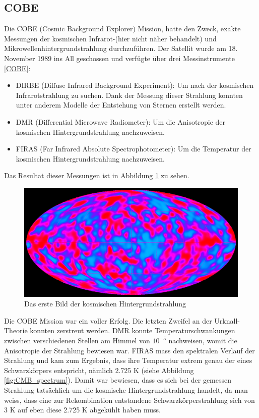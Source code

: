 \subsection{COBE}
Die COBE (Cosmic Background Explorer) Mission, hatte den Zweck, exakte 
Messungen der kosmischen Infrarot-(hier nicht näher behandelt) und 
Mikrowellenhintergrundstrahlung durchzuführen.
Der Satellit wurde am 18. November 1989 ins All geschossen und verfügte über 
drei Messinstrumente \ref{COBE}:
\begin{itemize}
	\item DIRBE (Diffuse Infrared Background Experiment): Um nach der 
	kosmischen Infrarotstrahlung zu suchen.
	Dank der Messung dieser Strahlung konnten unter anderem Modelle der 
	Entstehung von Sternen erstellt werden.
	\item DMR (Differential Microwave Radiometer): Um die Anisotropie der 
	kosmischen Hintergrundstrahlung nachzuweisen.
	\item FIRAS (Far Infrared Absolute Spectrophotometer): Um die Temperatur 
	der kosmischen Hintergrundstrahlung nachzuweisen. 
\end{itemize}

Das Resultat dieser Messungen ist in Abbildung \ref{fig:COBE} zu sehen.
\begin{figure}
	\includegraphics[width=\linewidth]{cmb/images/COBE_CMB.jpg}
	\caption{Das erste Bild der kosmischen Hintergrundstrahlung}
	\label{fig:COBE}
\end{figure}
Die COBE Mission war ein voller Erfolg.
Die letzten Zweifel an der Urknall-Theorie konnten zerstreut werden.
DMR konnte Temperaturschwankungen zwischen verschiedenen Stellen am Himmel 
von $10^{-5}$ nachweisen, womit die Anisotropie der Strahlung bewiesen war.
FIRAS mass den spektralen Verlauf der Strahlung und kam zum Ergebnis, dass ihre 
Temperatur extrem genau der eines Schwarzkörpers entspricht, nämlich 2.725 K 
(siehe Abbildung \ref{fig:CMB_spectrum}).
Damit war bewiesen, dass es sich bei der gemessen Strahlung tatsächlich um die 
kosmische Hintergrundstrahlung handelt, da man weiss, dass eine zur 
Rekombination entstandene Schwarzkörperstrahlung sich von 3 K auf eben diese 
2.725 K abgekühlt haben muss.

